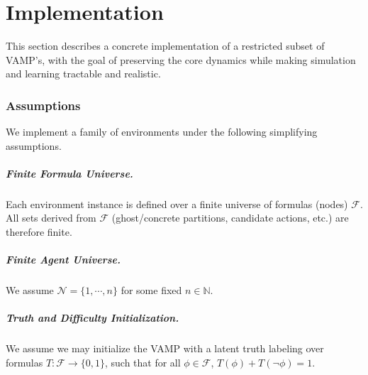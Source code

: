 \chapter{Implementation}\label{chap:implementation}
\renewcommand{\proves}{\vdash}

This section describes a concrete implementation of a restricted subset of VAMP's, with the goal of preserving the core dynamics while making simulation and learning tractable and realistic.


\subsection{Assumptions}

We implement a family of environments under the following simplifying assumptions.

\paragraph{Finite Formula Universe.}
Each environment instance is defined over a finite universe of formulas (nodes) $\mathcal{F}$.
All sets derived from $\mathcal{F}$ (ghost/concrete partitions, candidate actions, etc.)
are therefore finite.

\paragraph{Finite Agent Universe.}
We assume $\mathcal{N} = \{1,\cdots,n\}$ for some fixed $n \in \mathbb N$.


\paragraph{Truth and Difficulty Initialization.}

We assume we may initialize the VAMP with a latent truth labeling over formulas $T:\mathcal F\to\{0,1\}$, such that for all $\phi\in\mathcal F$, $T(\phi)+T(\neg\phi)=1$.


